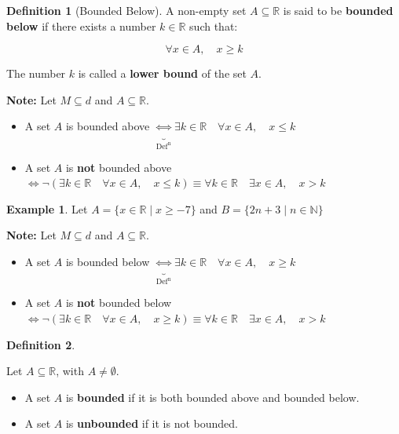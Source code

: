 \documentclass[
]{book}
\providecommand{\tightlist}{%
  \setlength{\itemsep}{0pt}\setlength{\parskip}{0pt}}
\theoremstyle{definition}
\newtheorem{definition}{Definition}[chapter]
\theoremstyle{definition}
\newtheorem{example}{Example}[chapter]
\theoremstyle{definition}
\theoremstyle{definition}
\theoremstyle{remark}
\begin{document}
\begin{definition}[Bounded Below]
\protect\hypertarget{def:unnamed-chunk-108}{}\label{def:unnamed-chunk-108}A non-empty set \(A \subseteq \mathbb{R}\) is said to be \textbf{bounded below} if there exists a number \(k \in \mathbb{R}\) such that:

\[
\forall x \in A, \quad x \geq k
\]

The number \(k\) is called a \textbf{lower bound} of the set \(A\).
\end{definition}

\textbf{Note:}
Let \(M \subseteq d\) and \(A \subseteq \mathbb{R}\).

\begin{itemize}
\item
  A set \(A\) is bounded above \(\underbrace{\iff}_{\text{Def}^\text{n}}
  \exists k \in \mathbb{R} \quad \forall x \in A, \quad x \leq k\)
\item
  A set \(A\) is \textbf{not} bounded above \(\iff \neg (\exists k \in \mathbb{R} \quad \forall x \in A, \quad x \leq k)\equiv\forall k \in \mathbb{R} \quad \exists x \in A, \quad x > k\)
\end{itemize}

\begin{example}
\protect\hypertarget{exm:unnamed-chunk-109}{}\label{exm:unnamed-chunk-109}Let \(A = \{ x \in \mathbb{R} \mid x \geq -7 \}\) and \(B = \{ 2n + 3 \mid n \in \mathbb{N} \}\)
\end{example}

\textbf{Note:}
Let \(M \subseteq d\) and \(A \subseteq \mathbb{R}\).

\begin{itemize}
\item
  A set \(A\) is bounded below \(\underbrace{\iff}_{\text{Def}^\text{n}}
  \exists k \in \mathbb{R} \quad \forall x \in A, \quad x \geq k\)
\item
  A set \(A\) is \textbf{not} bounded below \(\iff \neg (\exists k \in \mathbb{R} \quad \forall x \in A, \quad x \geq k)\equiv\forall k \in \mathbb{R} \quad \exists x \in A, \quad x > k\)
\end{itemize}

\begin{definition}
\protect\hypertarget{def:unnamed-chunk-110}{}\label{def:unnamed-chunk-110}

Let \(A \subseteq \mathbb{R}\), with \(A \neq \emptyset\).

\begin{itemize}
\tightlist
\item
  A set \(A\) is \textbf{bounded} if it is both bounded above and bounded below.
\item
  A set \(A\) is \textbf{unbounded} if it is not bounded.
\end{itemize}

\end{definition}
\end{document}
